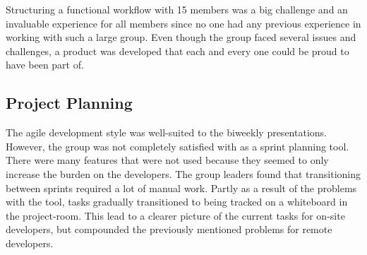 Structuring a functional workflow with 15 members was a big challenge and an invaluable experience for all members since no one had any previous experience in working with such a large group. Even though the group faced several issues and challenges, a product was developed that each and every one could be proud to have been part of.

\subsection{Project Planning}
The agile development style was well-suited to the biweekly presentations. However, the group was not completely satisfied with \taiga{} as a sprint planning tool. There were many features that were not used because they seemed to only increase the burden on the developers. The group leaders found that transitioning between sprints required a lot of manual work. Partly as a result of the problems with the tool, tasks gradually transitioned to being tracked on a whiteboard in the project-room. This lead to a clearer picture of the current tasks for on-site developers, but compounded the previously mentioned problems for remote developers.
